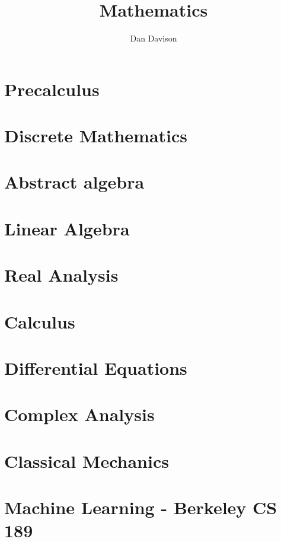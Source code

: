 \documentclass{book}
\title{Mathematics}
\author{Dan Davison}
\begin{document}
\frontmatter
\maketitle
\tableofcontents
\mainmatter


\chapter{Precalculus}


\chapter{Discrete Mathematics}


\chapter{Abstract algebra}


\chapter{Linear Algebra}


\chapter{Real Analysis}


\chapter{Calculus}



\chapter{Differential Equations}


\chapter{Complex Analysis}


\chapter{Classical Mechanics}


\chapter{Machine Learning - Berkeley CS 189}


\end{document}
